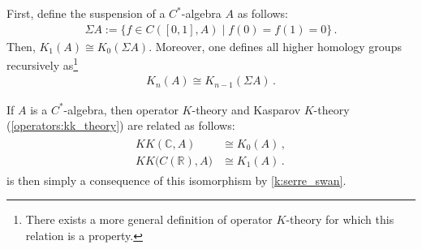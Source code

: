     \begin{property}
        First, define the suspension of a $C^*$-algebra $A$ as follows:
        \begin{gather}
            \Sigma A := \{f\in C([0,1],A)\mid f(0)=f(1)=0\}\,.
        \end{gather}
        Then, $K_1(A)\cong K_0(\Sigma A)$. Moreover, one defines all higher homology groups recursively as\footnote{There exists a more general definition of operator $K$-theory for which this relation is a property.}
        \begin{gather}
            K_n(A)\cong K_{n-1}(\Sigma A)\,.
        \end{gather}
    \end{property}

    \begin{property}[$K\!K$-theory]
        If $A$ is a $C^*$-algebra, then operator $K$-theory and Kasparov $K$-theory (\cref{operators:kk_theory}) are related as follows:
        \begin{gather}
            \begin{aligned}
                K\!K(\mathbb{C},A)&\cong K_0(A)\,,\\
                K\!K\bigl(C(\mathbb{R}),A\bigr)&\cong K_1(A)\,.
            \end{aligned}
        \end{gather}
         is then simply a consequence of this isomorphism by \cref{k:serre_swan}.
    \end{property}